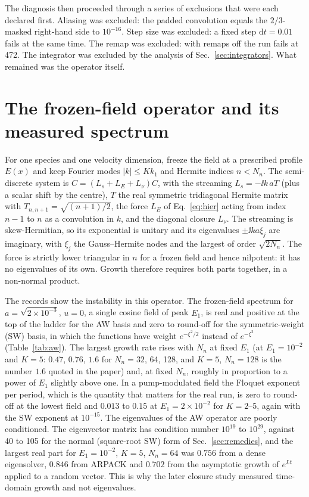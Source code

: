 The diagnosis then proceeded through a series of exclusions that were each declared first. Aliasing was excluded: the padded convolution equals the $2/3$-masked right-hand side to $10^{-16}$. Step size was excluded: a fixed step $\mathrm dt=0.01$ fails at the same time. The remap was excluded: with remaps off the run fails at 472. The integrator was excluded by the analysis of Sec.~\ref{sec:integrators}. What remained was the operator itself.

\section{The frozen-field operator and its measured spectrum}\label{sec:frozen}

For one species and one velocity dimension, freeze the field at a prescribed profile $E(x)$ and keep Fourier modes $|k|\le K k_1$ and Hermite indices $n<N_n$. The semi-discrete system is $\dot C=(L_s+L_E+L_\nu)C$, with the streaming $L_s=-\ii k\,aT$ (plus a scalar shift by the centre), $T$ the real symmetric tridiagonal Hermite matrix with $T_{n,n+1}=\sqrt{(n+1)/2}$, the force $L_E$ of Eq.~\eqref{eq:hier} acting from index $n-1$ to $n$ as a convolution in $k$, and the diagonal closure $L_\nu$. The streaming is skew-Hermitian, so its exponential is unitary and its eigenvalues $\pm\ii k a\xi_j$ are imaginary, with $\xi_j$ the Gauss--Hermite nodes and the largest of order $\sqrt{2N_n}$. The force is strictly lower triangular in $n$ for a frozen field and hence nilpotent: it has no eigenvalues of its own. Growth therefore requires both parts together, in a non-normal product.

The records show the instability in this operator. The frozen-field spectrum for $a=\sqrt{2\times10^{-3}}$, $u=0$, a single cosine field of peak $E_1$, is real and positive at the top of the ladder for the AW basis and zero to round-off for the symmetric-weight (SW) basis, in which the functions have weight $e^{-\xi^2/2}$ instead of $e^{-\xi^2}$ (Table~\ref{tab:aw}). The largest growth rate rises with $N_n$ at fixed $E_1$ (at $E_1=10^{-2}$ and $K=5$: $0.47$, $0.76$, $1.6$ for $N_n=32$, 64, 128, and $K=5$, $N_n=128$ is the number $1.6$ quoted in the paper) and, at fixed $N_n$, roughly in proportion to a power of $E_1$ slightly above one. In a pump-modulated field the Floquet exponent per period, which is the quantity that matters for the real run, is zero to round-off at the lowest field and $0.013$ to $0.15$ at $E_1=2\times10^{-2}$ for $K=2$--5, again with the SW exponent at $10^{-15}$. The eigenvalues of the AW operator are poorly conditioned. The eigenvector matrix has condition number $10^{19}$ to $10^{29}$, against 40 to 105 for the normal (square-root SW) form of Sec.~\ref{sec:remedies}, and the largest real part for $E_1=10^{-2}$, $K=5$, $N_n=64$ was $0.756$ from a dense eigensolver, $0.846$ from ARPACK and $0.702$ from the asymptotic growth of $e^{Lt}$ applied to a random vector. This is why the later closure study measured time-domain growth and not eigenvalues.

